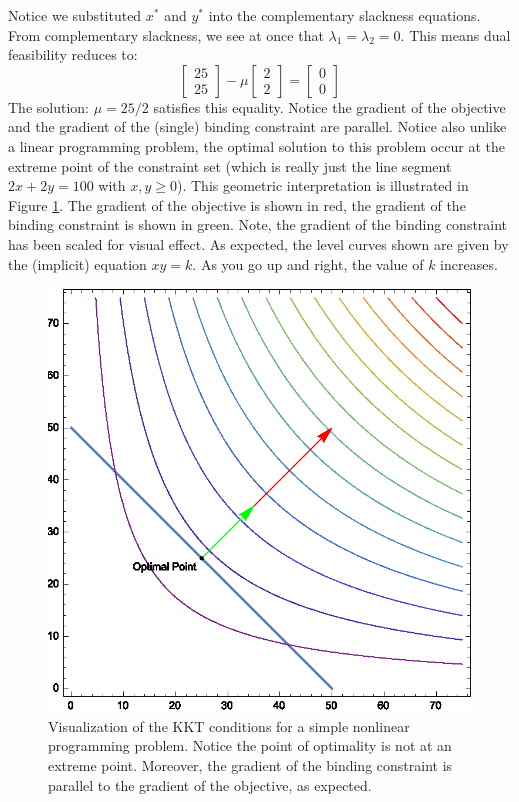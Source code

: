 Notice we substituted $x^*$ and $y^*$ into the complementary slackness equations. From complementary slackness, we see at once that $\lambda_1 = \lambda_2 = 0$. This means dual feasibility reduces to:
\begin{displaymath}
\begin{bmatrix}25\\25\end{bmatrix} - \mu\begin{bmatrix}2\\2\end{bmatrix} = \begin{bmatrix}0\\0\end{bmatrix}
\end{displaymath}
The solution: $\mu = 25/2$ satisfies this equality. Notice the gradient of the objective and the gradient of the (single) binding constraint are parallel. Notice also unlike a linear programming problem, the optimal solution to this problem  occur at the extreme point of the constraint set (which is really just the line segment $2x + 2y = 100$ with $x,y\geq 0$). This geometric interpretation is illustrated in Figure \ref{fig:KKTNLP}. The gradient of the objective is shown in red, the gradient of the binding constraint is shown in green. Note, the gradient of the binding constraint has been scaled for visual effect. As expected, the level curves shown are given by the (implicit) equation $xy = k$. As you go up and right, the value of $k$ increases.
\begin{figure}[htbp]
\centering
\includegraphics[scale=0.75]{imported_figures/KKTNLP.eps}
\caption{Visualization of the KKT conditions for a simple nonlinear programming problem. Notice the point of optimality is not at an extreme point. Moreover, the gradient of the binding constraint is parallel to the gradient of the objective, as expected. }
\label{fig:KKTNLP}
\end{figure}


